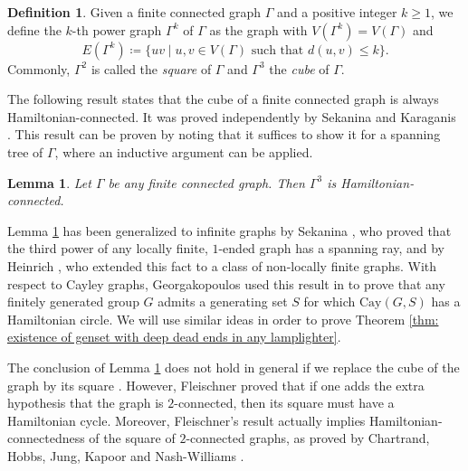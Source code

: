 \documentclass[reqno,oneside]{amsart}
\newcommand{\cay}[2]{\mathrm{Cay}(#1,#2)}
\theoremstyle{plain}
\newtheorem{lem}[thm]{Lemma}
\theoremstyle{definition}
\newtheorem{defn}[thm]{Definition} %
\begin{document}
\begin{defn}\label{def: kth power of a graph} Given a finite connected graph $\Gamma$ and a positive integer $k\ge 1$, we define the $k$-th power graph $\Gamma^k$ of $\Gamma$ as the graph with $V(\Gamma^k)=V(\Gamma)$ and $$E(\Gamma^k)\coloneqq \{uv\mid u,v\in V(\Gamma)\text{ such that }d(u,v)\le k  \}.$$
	Commonly, $\Gamma^2$ is called the \textit{square} of $\Gamma$ and $\Gamma^3$ the \textit{cube} of $\Gamma$.
\end{defn}

The following result states that the cube of a finite connected graph is always Hamiltonian-connected. It was proved independently by Sekanina \cite{Sekanina1960} and Karaganis \cite{KaraganisCubeGraph1968}. This result can be proven by noting that it suffices to show it for a spanning tree of $\Gamma$, where an inductive argument can be applied.
\begin{lem} \label{lem: the cube of a connected graph is Hamiltonian connected} Let $\Gamma$ be any finite connected graph. Then $\Gamma^3$ is Hamiltonian-connected.
\end{lem}

Lemma \ref{lem: the cube of a connected graph is Hamiltonian connected} has been generalized to infinite graphs by Sekanina \cite{Sekanina1960}, who proved that the third power of any locally finite, $1$-ended graph has a spanning ray, and by Heinrich \cite{Heinrich1978}, who extended this fact to a class of non-locally finite graphs. With respect to Cayley graphs, Georgakopoulos used this result in \cite{GeorgakopoulosHamiltonian2009} to prove that any finitely generated group $G$ admits a generating set $S$ for which $\cay{G}{S}$ has a Hamiltonian circle.  We will use similar ideas in order to prove Theorem \ref{thm: existence of genset with deep dead ends in any lamplighter}.


The conclusion of Lemma \ref{lem: the cube of a connected graph is Hamiltonian connected} does not hold in general if we replace the cube of the graph by its square \cite[Figure 6.14]{GraphsandDigraphsbook2016}. However, Fleischner \cite{FleischnerTwoConnected1974,FleischnerSpanningSubgraphs1974} proved that if one adds the extra hypothesis that the graph is $2$-connected, then its square must have a Hamiltonian cycle. Moreover, Fleischner's result actually implies Hamiltonian-connectedness of the square of $2$-connected graphs, as proved by Chartrand, Hobbs, Jung, Kapoor and Nash-Williams \cite{ChartrandHobbsJungKapoorNashWilliams1974}.
\end{document}
